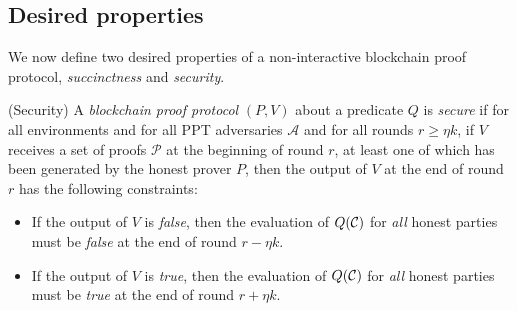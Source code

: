 \subsection{Desired properties}

We now define two desired properties of a non-interactive blockchain proof
protocol, \emph{succinctness} and \emph{security}.

\begin{definition}{(Security)}
A \emph{blockchain proof protocol} $(P, V)$ about a predicate $Q$ is
\emph{secure} if for all environments and for all PPT adversaries $\mathcal{A}$
and for all rounds $r \geq \eta k$, if $V$ receives a set of proofs
$\mathcal{P}$ at the beginning of round $r$, at least one of which has been
generated by the honest prover $P$, then the output of $V$ at the end of round
$r$ has the following constraints:
\begin{itemize}
  \item If the output of $V$ is \emph{false}, then the evaluation of $Q(\mathcal{C})$
        for \emph{all} honest parties must be \emph{false} at the end of round
        $r - \eta k$.
  \item If the output of $V$ is \emph{true}, then the evaluation of $Q(\mathcal{C})$
        for \emph{all} honest parties must be \emph{true} at the end of round
        $r + \eta k$.
\end{itemize}
\end{definition}

